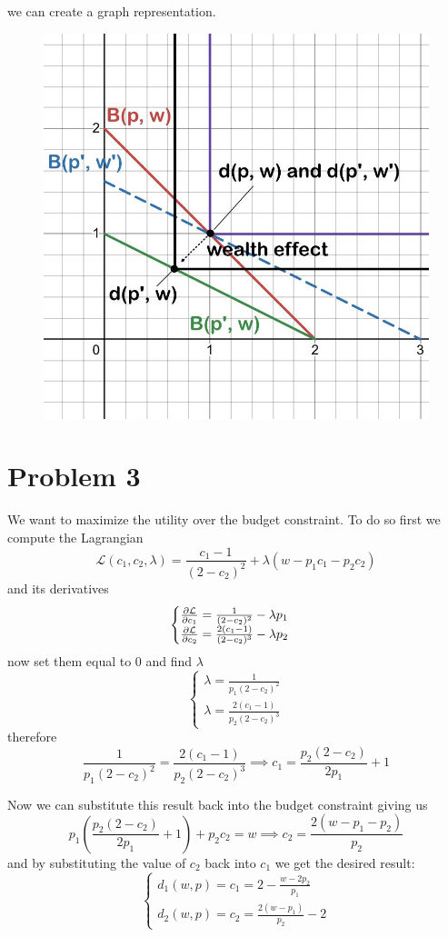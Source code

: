 \documentclass[12pt]{extarticle}
\numberwithin{table}{section}
\numberwithin{figure}{section}
\numberwithin{equation}{section}
\begin{document}
we can create a graph representation.
\begin{figure}[H]
    \centering
    \includegraphics[width=0.5\linewidth]{assets/decision-theory/ps2-ex2.jpg}
\end{figure}


\section*{Problem 3}

We want to maximize the utility over the budget constraint.
To do so first we compute the Lagrangian
\begin{equation}
    \mathcal L(c_1, c_2, \lambda) = \frac{c_1 -1}{(2 - c_2)^2} + \lambda(w - p_1 c_1 - p_2 c_2)
\end{equation}
and its derivatives
\begin{equation}
    \begin{cases}
        \pdv{\mathcal L}{c_1} = \frac{1}{(2-c_2)^2} - \lambda p_1 \\
        \pdv{\mathcal L}{c_2} = \frac{2(c_1 - 1)}{(2-c_2)^3} - \lambda p_2
    \end{cases}
\end{equation}
now set them equal to $0$ and find $\lambda$
\begin{equation}
    \begin{cases}
        \lambda = \frac{1}{p_1 (2-c_2)^2} \\
        \lambda = \frac{2(c_1 - 1)}{p_2 (2-c_2)^3}
    \end{cases}
\end{equation}
therefore
\begin{equation}
    \frac{1}{p_1 (2-c_2)^2} = \frac{2(c_1 - 1)}{p_2 (2-c_2)^3}
    \implies c_1 = \frac{p_2(2-c_2)}{2p_1} + 1
\end{equation}

Now we can substitute this result back into the budget constraint giving us
\begin{equation}
    p_1 \left( \frac{p_2(2-c_2)}{2p_1} + 1 \right) + p_2 c_2 = w
    \implies c_2 = \frac{2(w - p_1 - p_2)}{p_2}
\end{equation}
and by substituting the value of $c_2$ back into $c_1$ we get the desired result:
\begin{equation}
    \begin{cases}
        d_1(w, p) = c_1 = 2 - \frac{w - 2p_2}{p_1} \\
        d_2(w, p) = c_2 = \frac{2(w - p_1)}{p_2} - 2
    \end{cases}
\end{equation}
\end{document}
